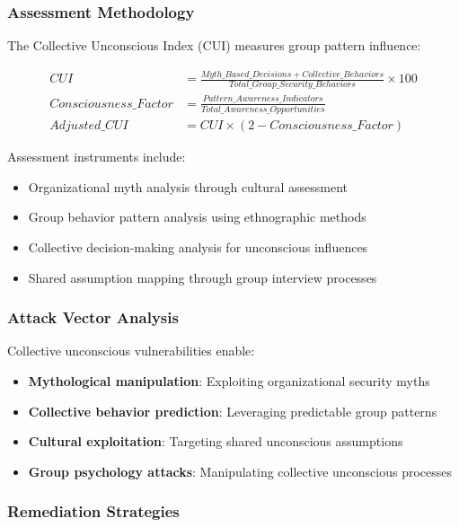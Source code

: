 \documentclass[11pt,a4paper]{article}
\begin{document}
\subsubsection{Assessment Methodology}

The Collective Unconscious Index (CUI) measures group pattern influence:

\begin{align}
CUI &= \frac{Myth\_Based\_Decisions + Collective\_Behaviors}{Total\_Group\_Security\_Behaviors} \times 100 \\
Consciousness\_Factor &= \frac{Pattern\_Awareness\_Indicators}{Total\_Awareness\_Opportunities} \\
Adjusted\_CUI &= CUI \times (2 - Consciousness\_Factor)
\end{align}

Assessment instruments include:
\begin{itemize}
\item Organizational myth analysis through cultural assessment
\item Group behavior pattern analysis using ethnographic methods
\item Collective decision-making analysis for unconscious influences
\item Shared assumption mapping through group interview processes
\end{itemize}

\subsubsection{Attack Vector Analysis}

Collective unconscious vulnerabilities enable:

\begin{itemize}
\item \textbf{Mythological manipulation}: Exploiting organizational security myths
\item \textbf{Collective behavior prediction}: Leveraging predictable group patterns
\item \textbf{Cultural exploitation}: Targeting shared unconscious assumptions
\item \textbf{Group psychology attacks}: Manipulating collective unconscious processes
\end{itemize}

\subsubsection{Remediation Strategies}
\end{document}

